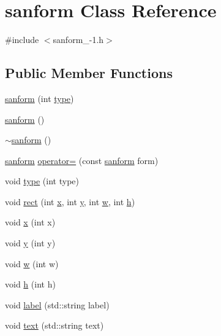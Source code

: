 \hypertarget{classsanform}{}\section{sanform Class Reference}
\label{classsanform}


{\ttfamily \#include $<$sanform\+\_-\/1.\+h$>$}

\subsection*{Public Member Functions}
\begin{DoxyCompactItemize}
\item 
\hyperlink{classsanform_aea12ed600aa10bc27f8c70c2288a6b59}{sanform} (int \hyperlink{classsanform_a600669969b17c578a481941e31f9daa4}{type})
\item 
\hyperlink{classsanform_a5630c259e16aed935d9cc2d88d6563d0}{sanform} ()
\item 
\hyperlink{classsanform_a4411730a5a9f45f636add205c0592e5e}{$\sim$sanform} ()
\item 
\hyperlink{classsanform}{sanform} \hyperlink{classsanform_affb90393a7d0da2d2762a790f1b5f3f8}{operator=} (const \hyperlink{classsanform}{sanform} form)
\item 
void \hyperlink{classsanform_a600669969b17c578a481941e31f9daa4}{type} (int type)
\item 
void \hyperlink{classsanform_a429dffca440813098d2adf4adeec76e9}{rect} (int \hyperlink{classsanform_ac80311b5301b043b95df12174f02747a}{x}, int \hyperlink{classsanform_a1b6a28d8eff5746841ff8c925f59df2e}{y}, int \hyperlink{classsanform_a7be2974d45a45eb0dc5397da0613d999}{w}, int \hyperlink{classsanform_ab250ab337127daf2c98ad7c28332b965}{h})
\item 
void \hyperlink{classsanform_ac80311b5301b043b95df12174f02747a}{x} (int x)
\item 
void \hyperlink{classsanform_a1b6a28d8eff5746841ff8c925f59df2e}{y} (int y)
\item 
void \hyperlink{classsanform_a7be2974d45a45eb0dc5397da0613d999}{w} (int w)
\item 
void \hyperlink{classsanform_ab250ab337127daf2c98ad7c28332b965}{h} (int h)
\item 
void \hyperlink{classsanform_ae483dc34f5f3ec35d03b8176638e529f}{label} (std\+::string label)
\item 
void \hyperlink{classsanform_a9e549fdf79f5c44a6b04b8a80370381e}{text} (std\+::string text)
\item 

\end{DoxyCompactItemize}

